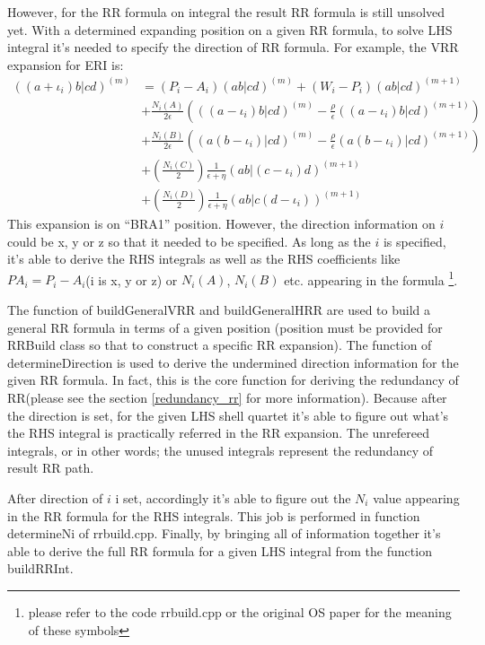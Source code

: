 However, for the RR formula on integral the result RR formula is still unsolved yet.
With a determined expanding position on a given RR formula, to solve LHS integral
it's needed to specify the direction of RR formula. For example, the VRR expansion 
for ERI is:
\begin{equation}
 \begin{split}
((a+\iota_{i})b|cd)^{(m)} &= (P_{i} - A_{i})(ab|cd)^{(m)} +
\left(W_{i} -P_{i}\right)(ab|cd)^{(m+1)} \\
&+\frac{N_{i}(A)}{2\epsilon}\left(((a-\iota_{i})b|cd)^{(m)}-\frac{\rho}{
\epsilon }((a-\iota_{i})b|cd)^{(m+1)}\right)  \\
&+\frac{N_{i}(B)}{2\epsilon}\left((a(b-\iota_{i})|cd)^{(m)}-\frac{\rho}{
\epsilon }(a(b-\iota_{i})|cd)^{(m+1)}\right)  \\
&+\left(\frac{N_{i}(C)}{2}\right)\frac{1}{\epsilon+\eta}
(ab|(c-\iota_{i})d)^{(m+1)} \\
&+\left(\frac{N_{i}(D)}{2}\right)\frac{1}{\epsilon+\eta}
(ab|c(d-\iota_{i}))^{(m+1)}
\end{split}
\end{equation}
This expansion is on ``BRA1'' position. However, the direction information on $i$ 
could be x, y or z so that it needed to be specified. As long as the $i$ is specified,
it's able to derive the RHS integrals as well as the RHS coefficients like 
$PA_{i} = P_{i} - A_{i}$(i is x, y or z) or $N_{i}(A)$, $N_{i}(B)$ etc. appearing in
the formula \footnote{please refer to the code rrbuild.cpp or the original OS paper
\cite{OS1986} for the meaning of these symbols}.

The function of buildGeneralVRR and buildGeneralHRR are used to build a general 
RR formula in terms of a given position (position must be provided for RRBuild
class so that to construct a specific RR expansion). The function of determineDirection
is used to derive the undermined direction information for the given RR formula.
In fact, this is the core function for deriving the redundancy of RR(please see the 
section \ref{redundancy_rr} for more information). Because after
the direction is set, for the given LHS shell quartet it's able to figure out
what's the RHS integral is practically referred in the RR expansion. The unrefereed
integrals, or in other words; the unused integrals represent the redundancy of 
result RR path.

After direction of $i$ i set, accordingly it's able to figure out the $N_{i}$ value
appearing in the RR formula for the RHS integrals. This job is performed in function
determineNi of rrbuild.cpp. Finally, by bringing all of information together it's able
to derive the full RR formula for a given LHS integral from the function buildRRInt. 

